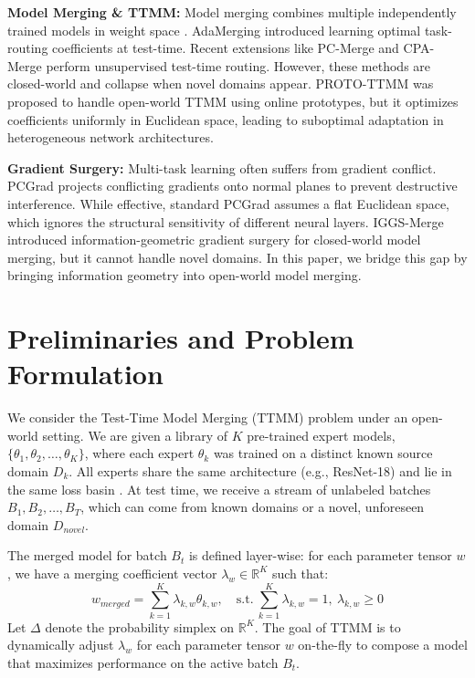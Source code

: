 \documentclass{article}
\theoremstyle{plain}
\theoremstyle{definition}
\theoremstyle{remark}
\begin{document}
\textbf{Model Merging \& TTMM:} Model merging combines multiple independently trained models in weight space \cite{matena2021merging, wortsman2022model}. AdaMerging \cite{yang2023adamerging} introduced learning optimal task-routing coefficients at test-time. Recent extensions like PC-Merge \cite{authors2026b} and CPA-Merge \cite{authors2026c} perform unsupervised test-time routing. However, these methods are closed-world and collapse when novel domains appear. PROTO-TTMM \cite{authors2026a} was proposed to handle open-world TTMM using online prototypes, but it optimizes coefficients uniformly in Euclidean space, leading to suboptimal adaptation in heterogeneous network architectures.

\textbf{Gradient Surgery:} Multi-task learning often suffers from gradient conflict. PCGrad \cite{yu2020gradient} projects conflicting gradients onto normal planes to prevent destructive interference. While effective, standard PCGrad assumes a flat Euclidean space, which ignores the structural sensitivity of different neural layers. IGGS-Merge \cite{authors2026c} introduced information-geometric gradient surgery for closed-world model merging, but it cannot handle novel domains. In this paper, we bridge this gap by bringing information geometry into open-world model merging.

\section{Preliminaries and Problem Formulation}
\label{prelim}

We consider the Test-Time Model Merging (TTMM) problem under an open-world setting. We are given a library of $K$ pre-trained expert models, $\{\theta_1, \theta_2, \dots, \theta_K\}$, where each expert $\theta_k$ was trained on a distinct known source domain $D_k$. All experts share the same architecture (e.g., ResNet-18) and lie in the same loss basin \cite{frankle2020linear, neyshabur2020what}. At test time, we receive a stream of unlabeled batches $B_1, B_2, \dots, B_T$, which can come from known domains or a novel, unforeseen domain $D_{novel}$.

The merged model for batch $B_t$ is defined layer-wise: for each parameter tensor $w$, we have a merging coefficient vector $\lambda_w \in \mathbb{R}^K$ such that:
\begin{equation}
  w_{merged} = \sum_{k=1}^K \lambda_{k,w} \theta_{k,w}, \quad \text{s.t.} \ \sum_{k=1}^K \lambda_{k,w} = 1, \ \lambda_{k,w} \geq 0
\end{equation}
Let $\Delta$ denote the probability simplex on $\mathbb{R}^K$. The goal of TTMM is to dynamically adjust $\lambda_w$ for each parameter tensor $w$ on-the-fly to compose a model that maximizes performance on the active batch $B_t$.
\end{document}
